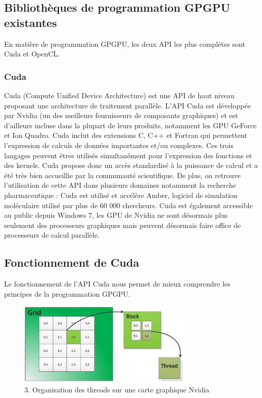 \documentclass{report}
\begin{document}
\begin{itemize}
\subsection{Bibliothèques de programmation GPGPU existantes}
En matière de programmation GPGPU, les deux API les plus complètes sont Cuda et OpenCL.
\subsubsection{Cuda}
Cuda (Compute Unified Device Architecture) est une API de haut niveau proposant une architecture de traitement parallèle.\newline
L'API Cuda est développée par Nvidia (un des meilleurs fournisseurs de composants graphiques) et est d'ailleurs incluse dans la plupart de leurs produits, notamment les GPU GeForce et Ion Quadro.\newline
Cuda inclut des extensions C, C++ et Fortran qui permettent l'expression de calculs de données importantes et/ou complexes.\newline
Ces trois langages peuvent êtres utilisés simultanément pour l'expression des fonctions et des kernels.\newline
Cuda propose donc un accès standardisé à la puissance de calcul et a été très bien accueillie par la communauté scientifique. De plus, on retrouve l'utilisation de cette API dans plusieurs domaines notamment la recherche pharmaceutique : Cuda est utilisé et accélère Amber, logiciel de simulation moléculaire utilisé par plus de 60 000 chercheurs.\newline
Cuda est également accessible au public depuis Windows 7, les GPU de Nvidia ne sont désormais plus seulement des processeurs graphiques mais peuvent désormais faire office de processeurs de calcul parallèle.

\subsection{Fonctionnement de Cuda}
Le fonctionnement de l'API Cuda nous permet de mieux comprendre les principes de la programmation GPGPU. \newline

\begin{figure}[!h]
\begin{center}
\includegraphics[height=150]{image_cuda.png}
\end{center}
\caption{3. Organisation des threads sur une carte graphique Nvidia}
\label{test}
\end{figure} \newline


\end{itemize}
\end{document}
